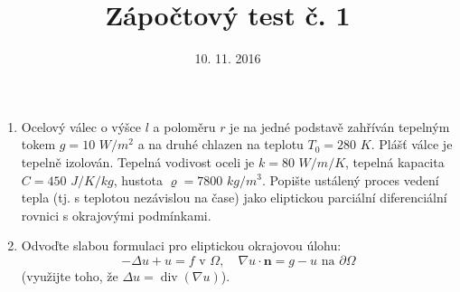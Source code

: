 \documentclass{article}
\renewcommand{\div}{\operatorname{div}}
\newcommand{\vc}[1]{\boldsymbol{#1}}
\begin{document}
\title{Zápočtový test č. 1}
\date{10. 11. 2016}
\author{}
\maketitle

\begin{enumerate}
\item Ocelový válec o výšce $l$ a poloměru $r$ je na jedné podstavě zahříván tepelným tokem $g=10$ $W/m^2$
a na druhé chlazen na teplotu $T_0=280$ $K$.
Plášť válce je tepelně izolován.
Tepelná vodivost oceli je $k=80$ $W/m/K$, tepelná kapacita $C=450$ $J/K/kg$, hustota $\varrho=7800$ $kg/m^3$.
Popište ustálený proces vedení tepla (tj. s teplotou nezávislou na čase) jako eliptickou parciální diferenciální rovnici s okrajovými podmínkami.

\item Odvoďte slabou formulaci pro eliptickou okrajovou úlohu:
\[ -\Delta u + u = f \mbox{ v }\Omega,\quad \nabla u\cdot\vc n=g-u \mbox{ na }\partial\Omega \]
(využijte toho, že $\Delta u=\div(\nabla u)$).

\end{enumerate}
\end{document}
